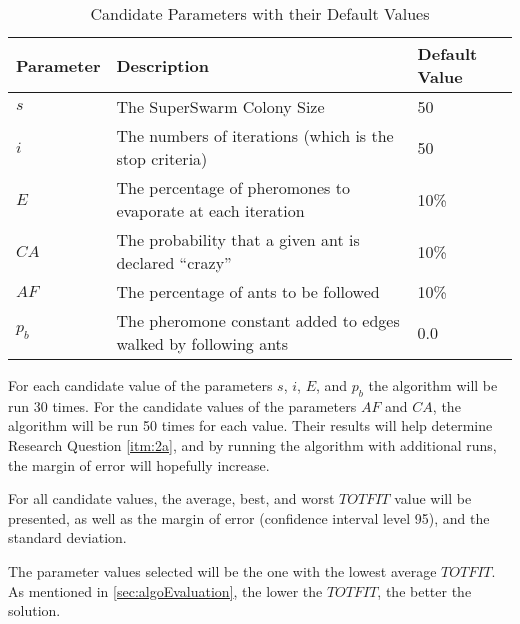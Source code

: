 \begin{table}[H]
	\small
	\begin{tabular}{|l|l|l|}
    	\hline
    	Parameter & Description & Default Value\\
    	\hline
    	$s$ & The SuperSwarm Colony Size & 50\\
    	$i$ & The numbers of iterations (which is the stop criteria) & 50\\
    	$E$ & The percentage of pheromones to evaporate at each iteration & 10\%\\
    	$CA$ & The probability that a given ant is declared ``crazy'' & 10\%\\
    	$AF$ & The percentage of ants to be followed & 10\%\\
        $p_b$ & The pheromone constant added to edges walked by following ants & 0.0\\
   	    \hline
    \end{tabular}
    \caption {Candidate Parameters with their Default Values}
    \label{table:parameters}
\end{table}

For each candidate value of the parameters $s$, $i$, $E$, and $p_b$ the algorithm will be run 30 times.  For the candidate values of the parameters $AF$ and $CA$, the algorithm will be run 50 times for each value. Their results will help determine Research Question \vref{itm:2a}, and by running the algorithm with additional runs, the margin of error will hopefully increase.

For all candidate values, the average, best, and worst $TOTFIT$ value will be presented, as well as the margin of error (confidence interval level 95), and the standard deviation. 

The parameter values selected will be the one with the lowest average $TOTFIT$. As mentioned in \vref{sec:algoEvaluation}, the lower the $TOTFIT$, the better the solution. 
